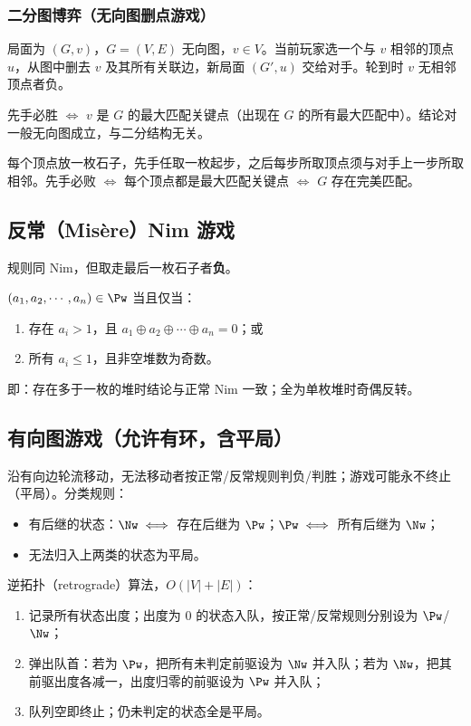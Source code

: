 \subsubsection{二分图博弈（无向图删点游戏）}
\begin{game}[二分图博弈]
	局面为 $(G,v)$，$G=(V,E)$ 无向图，$v\in V$。当前玩家选一个与 $v$ 相邻的顶点 $u$，从图中删去 $v$ 及其所有关联边，新局面 $(G',u)$ 交给对手。轮到时 $v$ 无相邻顶点者负。
\end{game}
\begin{theorem}
	先手必胜 $\iff$ $v$ 是 $G$ 的最大匹配关键点（出现在 $G$ 的所有最大匹配中）。结论对一般无向图成立，与二分结构无关。
\end{theorem}
\begin{corollary}[变体：相邻取石子]
	每个顶点放一枚石子，先手任取一枚起步，之后每步所取顶点须与对手上一步所取相邻。先手必败 $\iff$ 每个顶点都是最大匹配关键点 $\iff$ $G$ 存在完美匹配。
\end{corollary}

\subsection{反常（Mis\`ere）Nim 游戏}

规则同 Nim，但取走最后一枚石子者\textbf{负}。
\begin{theorem}
	$(a_1,a_2,\cdots,a_n)\in\Pw$ 当且仅当：
	\begin{enumerate}
		\item 存在 $a_i>1$，且 $a_1\oplus a_2\oplus\cdots\oplus a_n=0$；或
		\item 所有 $a_i\le1$，且非空堆数为奇数。
	\end{enumerate}
\end{theorem}
即：存在多于一枚的堆时结论与正常 Nim 一致；全为单枚堆时奇偶反转。

\subsection{有向图游戏（允许有环，含平局）}

沿有向边轮流移动，无法移动者按正常/反常规则判负/判胜；游戏可能永不终止（平局）。分类规则：
\begin{itemize}
	\item 有后继的状态：$\Nw \iff$ 存在后继为 $\Pw$；$\Pw \iff$ 所有后继为 $\Nw$；
	\item 无法归入上两类的状态为平局。
\end{itemize}
逆拓扑（retrograde）算法，$O(|V|+|E|)$：
\begin{enumerate}
	\item 记录所有状态出度；出度为 $0$ 的状态入队，按正常/反常规则分别设为 $\Pw$/$\Nw$；
	\item 弹出队首：若为 $\Pw$，把所有未判定前驱设为 $\Nw$ 并入队；若为 $\Nw$，把其前驱出度各减一，出度归零的前驱设为 $\Pw$ 并入队；
	\item 队列空即终止；仍未判定的状态全是平局。
\end{enumerate}

